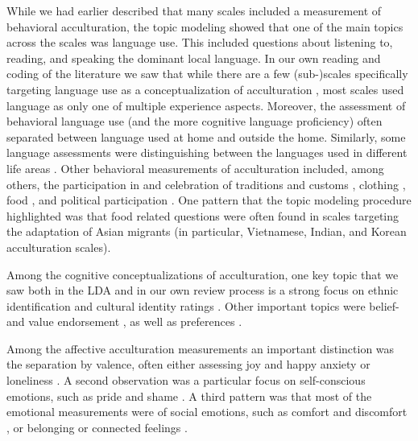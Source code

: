 While we had earlier described that many scales included a measurement
of behavioral acculturation, the topic modeling showed that one of the
main topics across the scales was language use. This included questions
about listening to, reading, and speaking the dominant local language.
In our own reading and coding of the literature we saw that while there
are a few (sub-)scales specifically targeting language use as a
conceptualization of acculturation
\citep[e.g.,][]{Deyo1985, ICSEYteam2006}, most scales used language as
only one of multiple experience aspects. Moreover, the assessment of
behavioral language use (and the more cognitive language proficiency)
often separated between language used at home and outside the home.
Similarly, some language assessments were distinguishing between the
languages used in different life areas
\citep[ e.g., media consumption, among friends, at work][for more information see Supplemental Material B]{Birman2002}.
Other behavioral measurements of acculturation included, among others,
the participation in and celebration of traditions and customs
\citep[e.g.,][]{Rezentes1993, Wilson2013, Cortes1994}, clothing
\citep[e.g.,][]{Ghuman2000}, food \citep[e.g.,][]{Schaefer2009}, and
political participation \citep[e.g.,][]{Jeong2016, Uslaner2005}. One
pattern that the topic modeling procedure highlighted was that food
related questions were often found in scales targeting the adaptation of
Asian migrants (in particular, Vietnamese, Indian, and Korean
acculturation scales).

Among the cognitive conceptualizations of acculturation, one key topic
that we saw both in the LDA and in our own review process is a strong
focus on ethnic identification and cultural identity ratings
\citep[e.g.,][]{Jadalla2015, Mchitarjan2015}. Other important topics
were belief- \citep[e.g.,][]{Klonoff2000} and value endorsement
\citep[e.g.,][]{Kim2010a, Wolfe2001, Duarte2020}, as well as preferences
\citep[e.g.,][]{BenetMartinez2006, Tull2003}.

Among the affective acculturation measurements an important distinction
was the separation by valence, often either assessing joy and happy
\citep[e.g.,][]{Phinney1992, Cuellar1995a} anxiety or loneliness
\citep[e.g.,][]{Shin1999, Perez2019}. A second observation was a
particular focus on self-conscious emotions, such as pride and shame
\citep[e.g.,][]{Tsai2000, Suinn1992}. A third pattern was that most of
the emotional measurements were of social emotions, such as comfort and
discomfort \citep[e.g.,][]{Stephenson2000}, or belonging or connected
feelings \citep[e.g.,][]{Kouli2009, Harder2018}.

